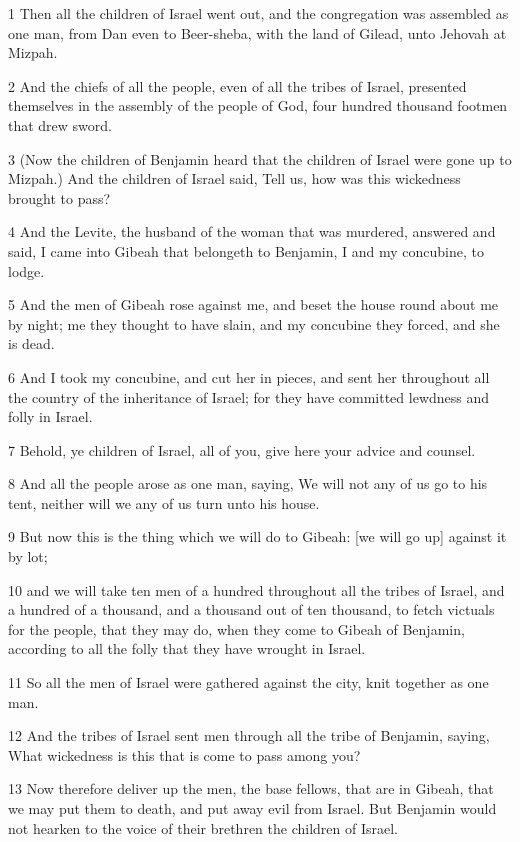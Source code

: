 \par 1 Then all the children of Israel went out, and the congregation was assembled as one man, from Dan even to Beer-sheba, with the land of Gilead, unto Jehovah at Mizpah.
\par 2 And the chiefs of all the people, even of all the tribes of Israel, presented themselves in the assembly of the people of God, four hundred thousand footmen that drew sword.
\par 3 (Now the children of Benjamin heard that the children of Israel were gone up to Mizpah.) And the children of Israel said, Tell us, how was this wickedness brought to pass?
\par 4 And the Levite, the husband of the woman that was murdered, answered and said, I came into Gibeah that belongeth to Benjamin, I and my concubine, to lodge.
\par 5 And the men of Gibeah rose against me, and beset the house round about me by night; me they thought to have slain, and my concubine they forced, and she is dead.
\par 6 And I took my concubine, and cut her in pieces, and sent her throughout all the country of the inheritance of Israel; for they have committed lewdness and folly in Israel.
\par 7 Behold, ye children of Israel, all of you, give here your advice and counsel.
\par 8 And all the people arose as one man, saying, We will not any of us go to his tent, neither will we any of us turn unto his house.
\par 9 But now this is the thing which we will do to Gibeah: [we will go up] against it by lot;
\par 10 and we will take ten men of a hundred throughout all the tribes of Israel, and a hundred of a thousand, and a thousand out of ten thousand, to fetch victuals for the people, that they may do, when they come to Gibeah of Benjamin, according to all the folly that they have wrought in Israel.
\par 11 So all the men of Israel were gathered against the city, knit together as one man.
\par 12 And the tribes of Israel sent men through all the tribe of Benjamin, saying, What wickedness is this that is come to pass among you?
\par 13 Now therefore deliver up the men, the base fellows, that are in Gibeah, that we may put them to death, and put away evil from Israel. But Benjamin would not hearken to the voice of their brethren the children of Israel.
